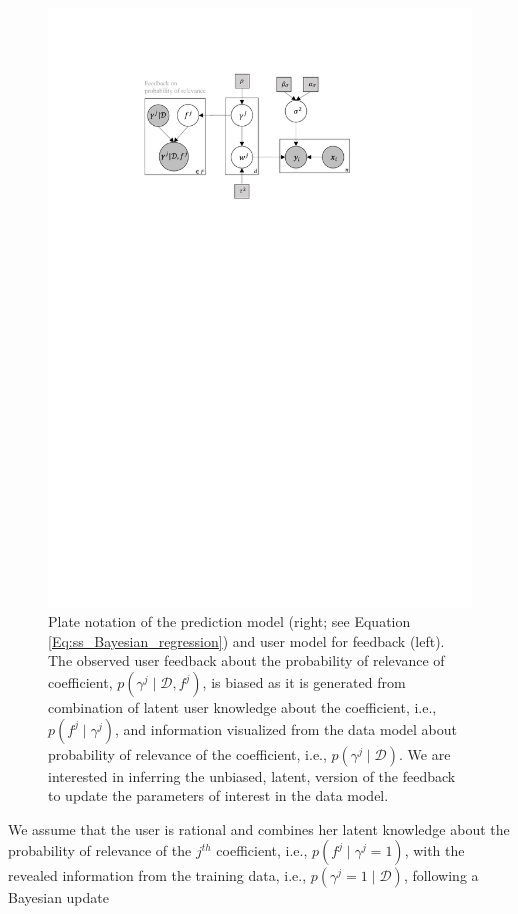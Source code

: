 \documentclass[dissertation,math,vertlayout,pdfa,colorlinks]{aaltoseries}
\newcommand{\bD}{\mathcal{D}}
\begin{document}
\begin{figure}
	\centering
	\includegraphics[width=0.80\linewidth]{Figures/Plate_diagram_OF.pdf}
	\caption{Plate notation of the prediction model (right; see Equation \ref{Eq:ss_Bayesian_regression}) and user model for feedback (left). The observed user feedback about the probability of relevance of coefficient, $p(\gamma^j \mid \bD,f^j)$, is biased as it is generated from combination of latent user knowledge about the coefficient, i.e., $p(f^j \mid \gamma^j)$, and information visualized from the data model about probability of relevance of the coefficient, i.e., $p(\gamma^j\mid \bD)$. We are interested in inferring the unbiased, latent, version of the feedback to update the parameters of interest in the data model.}
	\label{fig:Plate_OF}
\end{figure}
 
 
 
We assume that the user is rational and combines her latent knowledge about the probability of relevance of the $j^{th}$ coefficient, i.e., $p(f^{j} \mid \gamma^j=1)$, with the revealed information from the training data, i.e., $p(\gamma^j =1 \mid \bD)$, following a Bayesian update
\end{document}
